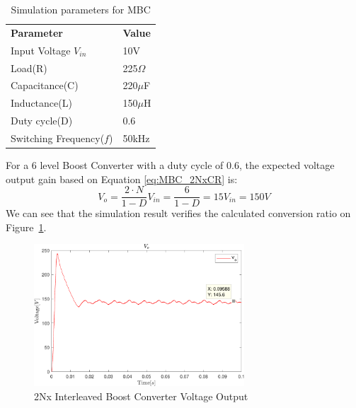 \begin{table}[H]
\begin{center}
\caption {Simulation parameters for MBC} \label{tab:MBC_2Nx} 
\begin{tabular}{|l|l|}
\cline{1-2}
\textbf{Parameter} & \textbf{Value}  \\ \cline{1-2}
Input Voltage $V_{in}$          &      10V   \\ \cline{1-2}
Load(R)   & 225$\Omega$           \\ \cline{1-2}
Capacitance(C)          &       220$\mu$F     \\ \cline{1-2}
Inductance(L)          &      150$\mu$H      \\ \cline{1-2}
Duty cycle(D)          &     0.6       \\ \cline{1-2}
Switching Frequency($f$)          &      50kHz      \\ \cline{1-2}
\end{tabular}
\end{center}
\end{table} 
\vspace{-8mm}
For a 6 level Boost Converter with a duty cycle of 0.6, the expected voltage output gain based on Equation \ref{eq:MBC_2NxCR} is:
\begin{equation}
	V_o = \frac{2\cdot N}{1-D}V_{in} = \frac{6}{1-D}  = 15V_{in}=150V
\end{equation}
We can see that the simulation result verifies the calculated conversion ratio on Figure~\ref{fig:MBC_2NxSimResult}.\\
\vspace{-8mm}
\begin{figure}[H]
   \centering
   \includegraphics[width=0.7\textwidth]{figures/yy2NxMultilevelBC/2Nx_SimResults.pdf}
    \caption{2Nx Interleaved Boost Converter Voltage Output}
	\label{fig:MBC_2NxSimResult}
\end{figure}
\clearpage

